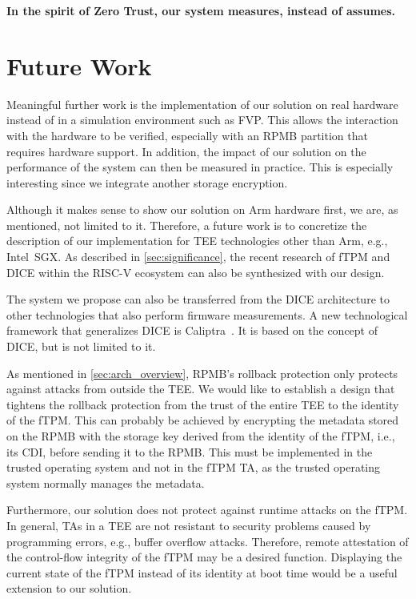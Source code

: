 \textbf{In the spirit of Zero Trust, our system measures, instead of assumes.}

\section{Future Work}

Meaningful further work is the implementation of our solution on real hardware instead of in a simulation environment such as FVP\@.
This allows the interaction with the hardware to be verified, especially with an RPMB partition that requires hardware support.
In addition, the impact of our solution on the performance of the system can then be measured in practice.
This is especially interesting since we integrate another storage encryption.

Although it makes sense to show our solution on Arm hardware first, we are, as mentioned, not limited to it.
Therefore, a future work is to concretize the description of our implementation for TEE technologies other than Arm, e.g., Intel~SGX\@.
As described in \autoref{sec:significance}, the recent research of \ac{fTPM} and \ac{DICE} within the RISC-V ecosystem can also be synthesized with our design.

The system we propose can also be transferred from the \ac{DICE} architecture to other technologies that also perform firmware measurements.
A new technological framework that generalizes \ac{DICE} is Caliptra~\cite{caliptra}.
It is based on the concept of \ac{DICE}, but is not limited to it.

As mentioned in \autoref{sec:arch_overview}, RPMB's rollback protection only protects against attacks from outside the TEE\@.
We would like to establish a design that tightens the rollback protection from the trust of the entire TEE to the identity of the fTPM\@.
This can probably be achieved by encrypting the metadata stored on the RPMB with the storage key derived from the identity of the fTPM, i.e., its CDI, before sending it to the RPMB\@.
This must be implemented in the trusted operating system and not in the fTPM TA, as the trusted operating system normally manages the metadata.

Furthermore, our solution does not protect against runtime attacks on the fTPM\@.
In general, \acp{TA} in a \ac{TEE} are not resistant to security problems caused by programming errors, e.g., buffer overflow attacks.
Therefore, remote attestation of the control-flow integrity of the fTPM may be a desired function.
Displaying the current state of the fTPM instead of its identity at boot time would be a useful extension to our solution.

